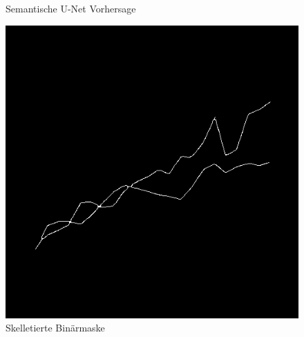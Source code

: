 \begin{figure}[H]
\begin{minipage}{0.315\textwidth}
        \caption{ Semantische U-Net Vorhersage}
        \label{fig:alg_pred}
    \end{minipage}\hfill %
    \begin{minipage}{0.315\textwidth} %
        \centering
        \includegraphics[width=\linewidth]{Implementation/img/alg_skeletonized.png}
        \caption{ Skelletierte Binärmaske}
        \label{fig:alg_skeletonized}
    \end{minipage}
\end{figure}

